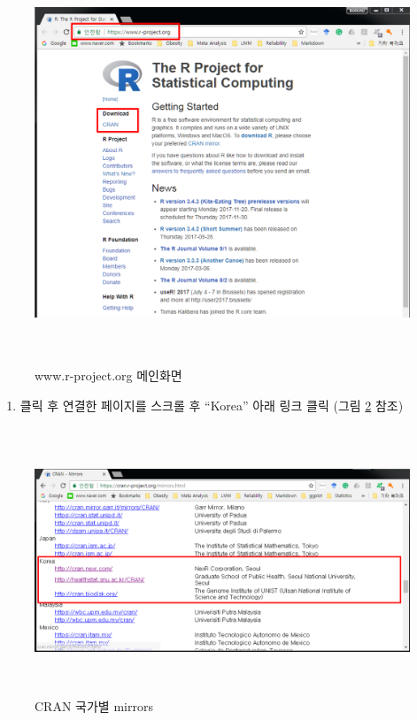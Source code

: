 \documentclass[12pt,a4paper]{book}
\providecommand{\tightlist}{%
  \setlength{\itemsep}{0pt}\setlength{\parskip}{0pt}}
\theoremstyle{definition}
\theoremstyle{definition}
\theoremstyle{definition}
\theoremstyle{remark}
\begin{document}
\begin{figure}[H]
{
  \centering
  \includegraphics[width = 12cm, height = 12cm]{Figures/Rorg-main-add.png}
  \caption[www.r-project.org 메인화면]{www.r-project.org 메인화면}\label{fig:R-install-01}
}
\end{figure}

\begin{enumerate}
\def\labelenumi{\arabic{enumi}.}
\setcounter{enumi}{2}
\tightlist
\item
  클릭 후 연결한 페이지를 스크롤 후 ``Korea'' 아래 링크 클릭 (그림
  \ref{fig:R-install-02} 참조)
\end{enumerate}

\begin{figure}[H]
{
  \centering
  \includegraphics[width = 12cm, height = 8cm]{Figures/CRAN-korea-01.PNG}
  \caption[CRAN 국가별 mirrors]{CRAN 국가별 mirrors}\label{fig:R-install-02}
}
\end{figure}
\end{document}
